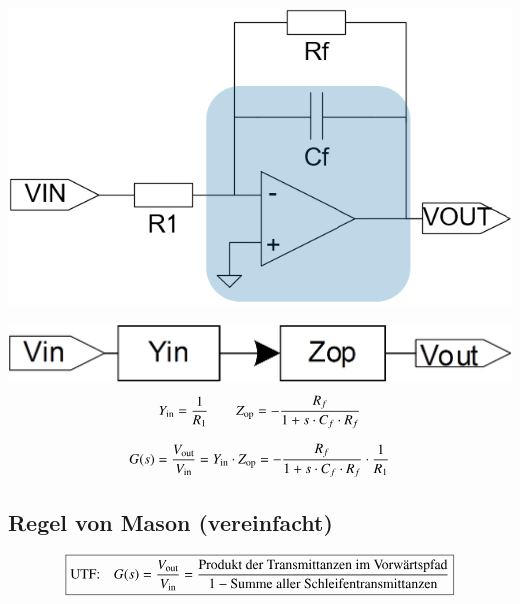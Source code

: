 \begin{minipage}[c]{0.4\columnwidth}
    \includegraphics[width=\columnwidth]{images/filter_signalflussdiagramme_tiefpass_ordnung_1.png}
\end{minipage}
\hfill
\begin{minipage}[c]{0.48\columnwidth}
    \includegraphics[width=\columnwidth]{images/filter_signalflussdiagramme_tiefpass_ordnung_1_sfd.png}
    $$ Y_{\rm in} = \frac{1}{R_1} \qquad Z_{\rm op} = - \frac{R_f}{1 + s \cdot C_f \cdot R_f} $$
\end{minipage}

$$ G(s)= \frac{V_{\rm out}}{V_{\rm in}} = Y_{\rm in} \cdot Z_{\rm op} =- \frac{R_f}{1 + s \cdot C_f \cdot R_f} \cdot \frac{1}{R_1} $$


\subsection{Regel von Mason (vereinfacht)}

$$ \boxed{ \text{UTF:} \quad G(s) = \frac{V_{\rm out}}{V_{\rm in}} = \frac{\text{Produkt der Transmittanzen im Vorwärtspfad}}{1 - \text{Summe aller Schleifentransmittanzen}} }$$



